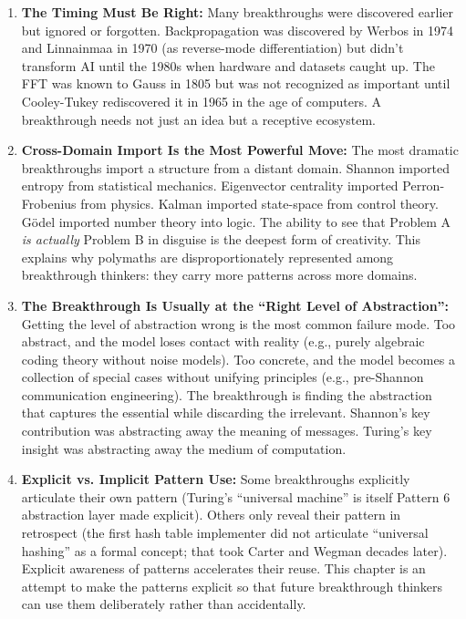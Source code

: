 \begin{enumerate}
\item \textbf{The Timing Must Be Right:} Many breakthroughs were discovered earlier but ignored or forgotten. Backpropagation was discovered by Werbos in 1974 and Linnainmaa in 1970 (as reverse-mode differentiation) but didn't transform AI until the 1980s when hardware and datasets caught up. The FFT was known to Gauss in 1805 but was not recognized as important until Cooley-Tukey rediscovered it in 1965 in the age of computers. A breakthrough needs not just an idea but a receptive ecosystem.

\item \textbf{Cross-Domain Import Is the Most Powerful Move:} The most dramatic breakthroughs import a structure from a distant domain. Shannon imported entropy from statistical mechanics. Eigenvector centrality imported Perron-Frobenius from physics. Kalman imported state-space from control theory. G\"odel imported number theory into logic. The ability to see that Problem A \emph{is actually} Problem B in disguise is the deepest form of creativity. This explains why polymaths are disproportionately represented among breakthrough thinkers: they carry more patterns across more domains.

\item \textbf{The Breakthrough Is Usually at the ``Right Level of Abstraction'':} Getting the level of abstraction wrong is the most common failure mode. Too abstract, and the model loses contact with reality (e.g., purely algebraic coding theory without noise models). Too concrete, and the model becomes a collection of special cases without unifying principles (e.g., pre-Shannon communication engineering). The breakthrough is finding the abstraction that captures the essential while discarding the irrelevant. Shannon's key contribution was abstracting away the meaning of messages. Turing's key insight was abstracting away the medium of computation.

\item \textbf{Explicit vs. Implicit Pattern Use:} Some breakthroughs explicitly articulate their own pattern (Turing's ``universal machine'' is itself Pattern 6 abstraction layer made explicit). Others only reveal their pattern in retrospect (the first hash table implementer did not articulate ``universal hashing'' as a formal concept; that took Carter and Wegman decades later). Explicit awareness of patterns accelerates their reuse. This chapter is an attempt to make the patterns explicit so that future breakthrough thinkers can use them deliberately rather than accidentally.


\end{enumerate}
